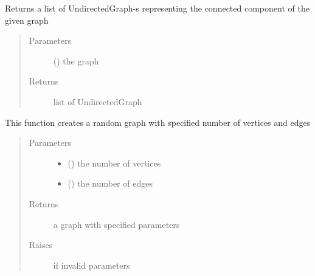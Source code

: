 \documentclass[letterpaper,10pt,english]{sphinxmanual}
\begin{document}

\begin{fulllineitems}
\label{\detokenize{UndirectedGraph:UndirectedGraph.get_connected_components}}
Returns a list of UndirectedGraph-s representing the connected component of the given graph
\begin{quote}\begin{description}
\item[{Parameters}] \leavevmode
{} ({\hyperref[\detokenize{UndirectedGraph:UndirectedGraph.UndirectedGraph}]{}}) \textendash{} the graph

\item[{Returns}] \leavevmode
list of UndirectedGraph

\end{description}\end{quote}

\end{fulllineitems}


\begin{fulllineitems}
\label{\detokenize{UndirectedGraph:UndirectedGraph.random_graph}}
This function creates a random graph with specified number of vertices and edges
\begin{quote}\begin{description}
\item[{Parameters}] \leavevmode\begin{itemize}
\item {} 
 () \textendash{} the number of vertices

\item {} 
 () \textendash{} the number of edges

\end{itemize}

\item[{Returns}] \leavevmode
a graph with specified parameters

\item[{Raises}] \leavevmode
{} \textendash{} if invalid parameters

\end{description}\end{quote}

\end{fulllineitems}
\end{document}
